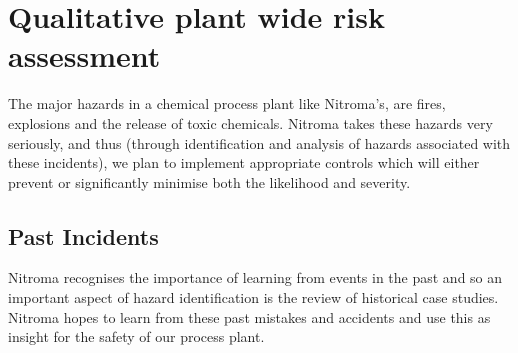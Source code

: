 \section{Qualitative plant wide risk assessment}

The major hazards in  a chemical process plant like Nitroma’s, are fires, explosions and the release of toxic chemicals. Nitroma takes these hazards very seriously, and thus (through identification and analysis of hazards associated with these incidents), we plan to implement appropriate controls which will either prevent or significantly minimise both the likelihood and severity. 

\subsection{Past Incidents}

Nitroma recognises the importance of learning from events in the past and so an important aspect of hazard identification is the review of historical case studies. Nitroma hopes to learn from these past mistakes and accidents and use this as insight for the safety of our process plant.

